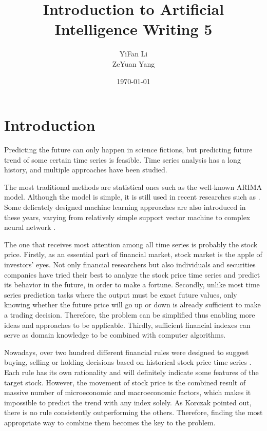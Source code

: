 \documentclass{article}
\title{Introduction to Artificial Intelligence Writing 5}
\author{YiFan Li\\ZeYuan Yang}
\date{\today}
\begin{document}
\maketitle
{}



\section{Introduction}

Predicting the future can only happen in science fictions,
but predicting future trend of some certain time series is feasible.
Time series analysis has a long history, and multiple approaches have been studied.

The most traditional methods are statistical ones such as the well-known ARIMA model.
Although the model is simple, it is still used in recent researches such as \cite{arima-bus-travel}.
Some delicately designed machine learning approaches are also introduced in these years,
varying from relatively simple support vector machine \cite{support-vector-machine}
to complex neural network \cite{time-series-prediction-and-neural-networks}.

The one that receives most attention among all time series is probably the stock price.
Firstly, as an essential part of financial market, stock market is the apple of investors' eyes.
Not only financial researchers but also individuals and securities companies have
tried their best to analyze the stock price time series and predict its behavior in the future,
in order to make a fortune.
Secondly, unlike most time series prediction tasks where the output must be exact future values,
only knowing whether the future price will go up or down is already sufficient to make a trading decision.
Therefore, the problem can be simplified thus enabling more ideas and approaches to be applicable.
Thirdly, sufficient financial indexes can serve as domain knowledge to be combined with computer algorithms.

Nowadays, over two hundred different financial rules were designed to
suggest buying, selling or holding decisions based on historical stock price time series \cite{stock-timing-using-genetic-algorithms}.
Each rule has its own rationality and will definitely indicate some features of the target stock.
However, the movement of stock price is the combined result of massive number of microeconomic and macroeconomic factors,
which makes it impossible to predict the trend with any index solely.
As Korczak \cite{stock-timing-using-genetic-algorithms} pointed out,
there is no rule consistently outperforming the others.
Therefore, finding the most appropriate way to combine them becomes the key to the problem.
\end{document}
